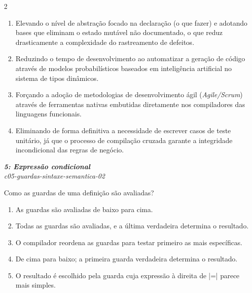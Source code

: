 \documentclass[a4paper,10pt,brazil]{article}
\begin{document}
\begin{multicols}{2}
\begin{enumerate}
  \item Elevando o nível de abstração focado na declaração (o que fazer) e adotando bases que eliminam o estado mutável não documentado, o que reduz drasticamente a complexidade do rastreamento de defeitos.

  \item Reduzindo o tempo de desenvolvimento ao automatizar a geração de código através de modelos probabilísticos baseados em inteligência artificial no sistema de tipos dinâmicos.

  \item Forçando a adoção de metodologias de desenvolvimento ágil (\emph{Agile/Scrum}) através de ferramentas nativas embutidas diretamente nos compiladores das linguagens funcionais.

  \item Eliminando de forma definitiva a necessidade de escrever casos de teste unitário, já que o processo de compilação cruzada garante a integridade incondicional das regras de negócio.


\end{enumerate}

\begin{flushright}
  \footnotesize
  \textit{\textbf{5: Expressão condicional}}\\
  \textit{c05-guardas-sintaxe-semantica-02}\\

\end{flushright}
Como as guardas de uma definição são avaliadas?

\begin{enumerate}
  \item As guardas são avaliadas de baixo para cima.

  \item Todas as guardas são avaliadas, e a última verdadeira determina o resultado.

  \item O compilador reordena as guardas para testar primeiro as mais específicas.

  \item De cima para baixo; a primeira guarda verdadeira determina o resultado.

  \item O resultado é escolhido pela guarda cuja expressão à direita de \haskellinline|=| parece mais simples.


\end{enumerate}


\end{multicols}
\end{document}
